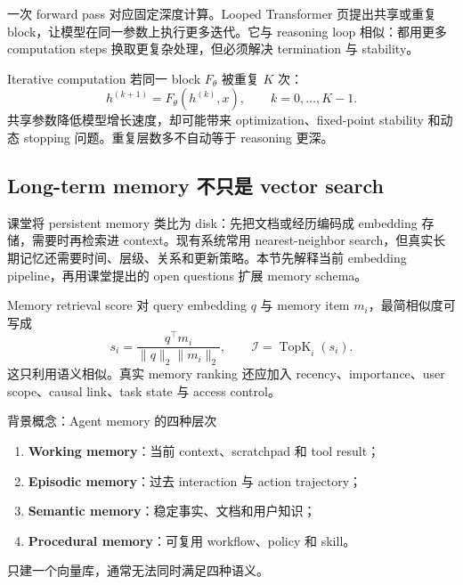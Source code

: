 一次 forward pass 对应固定深度计算。Looped Transformer 页提出共享或重复 block，让模型在同一参数上执行更多迭代。它与 reasoning loop 相似：都用更多 computation steps 换取更复杂处理，但必须解决 termination 与 stability。


\begin{importantbox}{Iterative computation}
若同一 block $F_\theta$ 被重复 $K$ 次：
\[
h^{(k+1)}=F_\theta(h^{(k)},x),\qquad k=0,\ldots,K-1.
\]
共享参数降低模型增长速度，却可能带来 optimization、fixed-point stability 和动态 stopping 问题。重复层数多不自动等于 reasoning 更深。
\end{importantbox}

\subsection{Long-term memory 不只是 vector search}

课堂将 persistent memory 类比为 disk：先把文档或经历编码成 embedding 存储，需要时再检索进 context。现有系统常用 nearest-neighbor search，但真实长期记忆还需要时间、层级、关系和更新策略。本节先解释当前 embedding pipeline，再用课堂提出的 open questions 扩展 memory schema。


\begin{importantbox}{Memory retrieval score}
对 query embedding $q$ 与 memory item $m_i$，最简相似度可写成
\[
s_i=\frac{q^\top m_i}{\lVert q\rVert_2\lVert m_i\rVert_2},\qquad
\mathcal{I}=\operatorname{TopK}_i(s_i).
\]
这只利用语义相似。真实 memory ranking 还应加入 recency、importance、user scope、causal link、task state 与 access control。
\end{importantbox}

\begin{knowledgebox}{背景概念：Agent memory 的四种层次}
\begin{enumerate}
  \item \textbf{Working memory}：当前 context、scratchpad 和 tool result；
  \item \textbf{Episodic memory}：过去 interaction 与 action trajectory；
  \item \textbf{Semantic memory}：稳定事实、文档和用户知识；
  \item \textbf{Procedural memory}：可复用 workflow、policy 和 skill。
\end{enumerate}
只建一个向量库，通常无法同时满足四种语义。
\end{knowledgebox}


